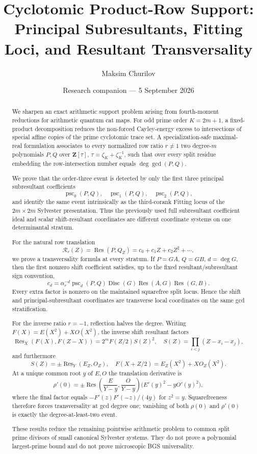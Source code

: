 \documentclass[11pt]{article}
\title{\textbf{Cyclotomic Product-Row Support:}\\
Principal Subresultants, Fitting Loci, and Resultant Transversality}
\author{Maksim Churilov}
\date{Research companion --- 5 September 2026}
\newcommand{\Res}{\operatorname{Res}}
\newcommand{\Disc}{\operatorname{Disc}}
\begin{document}
\maketitle

\begin{abstract}
We sharpen an exact arithmetic support problem arising from fourth-moment
reductions for arithmetic quantum cat maps.  For odd prime order $K=2m+1$, a
fixed-product decomposition reduces the non-forced Cayley-energy excess to
intersections of special affine copies of the prime cyclotomic trace set.  A
specialization-safe maximal-real formulation associates to every normalized
row ratio $r\ne1$ two degree-$m$ polynomials $P,Q$ over
$\mathbf Z[\tau]$, $\tau=\zeta_K+\zeta_K^{-1}$, such that over every split
residue embedding the row-intersection number equals $\deg\gcd(P,Q)$.

We prove that the order-three event is detected by only the first three
principal subresultant coefficients
\[
\operatorname{psc}_0(P,Q),\quad
\operatorname{psc}_1(P,Q),\quad
\operatorname{psc}_2(P,Q),
\]
and identify the same event intrinsically as the third-corank Fitting locus of
the $2m\times2m$ Sylvester presentation.  Thus the previously used full
subresultant coefficient ideal and scalar shift-resultant coordinates are
different coordinate systems on one determinantal stratum.

For the natural row translation
\[
\mathcal R_r(Z)=\Res(P,Q_Z)=c_0+c_1Z+c_2Z^2+\cdots,
\]
we prove a transversality formula at every stratum.  If
$P=GA$, $Q=GB$, $d=\deg G$, then the first nonzero shift coefficient satisfies,
up to the fixed resultant/subresultant sign convention,
\[
c_d=\alpha_r^{-d}\operatorname{psc}_d(P,Q)
\Disc(G)\Res(A,G)\Res(G,B).
\]
Every extra factor is nonzero on the maintained squarefree split locus.
Hence the shift and principal-subresultant coordinates are transverse local
coordinates on the same gcd stratification.

For the inverse ratio $r=-1$, reflection halves the degree.  Writing
$F(X)=E(X^2)+XO(X^2)$, the inverse shift resultant factors
\[
\Res_X(F(X),F(Z-X))=2^mF(Z/2)S(Z)^2,
\quad
S(Z)=\prod_{i<j}(Z-x_i-x_j),
\]
and furthermore
\[
S(Z)=\pm\Res_Y(E_Z,O_Z),
\quad F(X+Z/2)=E_Z(X^2)+XO_Z(X^2).
\]
At a unique common root $y$ of $E,O$ the translation derivative is
\[
\rho'(0)=\pm\Res\!\left(\frac E{Y-y},\frac O{Y-y}\right)
\bigl(E'(y)^2-yO'(y)^2\bigr),
\]
where the final factor equals
$-F'(z)F'(-z)/(4y)$ for $z^2=y$.  Squarefreeness therefore forces
transversality at gcd degree one; vanishing of both $\rho(0)$ and $\rho'(0)$
is exactly the degree-at-least-two event.

These results reduce the remaining pointwise arithmetic problem to common
split prime divisors of small canonical Sylvester systems.  They do not prove a
polynomial largest-prime bound and do not prove microscopic BGS universality.
\end{abstract}
\end{document}
